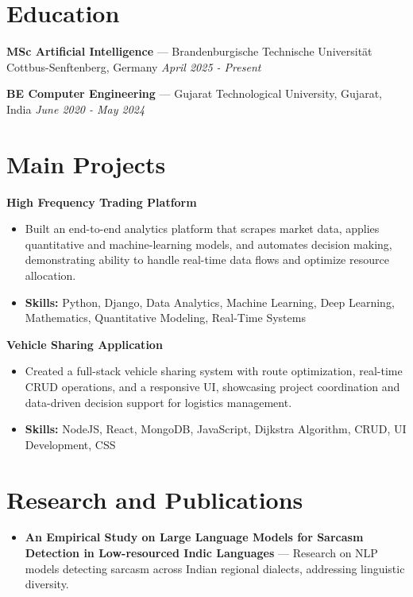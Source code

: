 \documentclass[a4paper,10pt]{article}
\begin{document}
\section*{Education}
\textbf{MSc Artificial Intelligence} — Brandenburgische Technische Universität Cottbus-Senftenberg, Germany \hfill \textit{April 2025 - Present}\par
\vspace{1.5pt}
\textbf{BE Computer Engineering} — Gujarat Technological University, Gujarat, India \hfill \textit{June 2020 - May 2024}\par

\section*{Main Projects}
\textbf{High Frequency Trading Platform}\par
\vspace{1pt}
\begin{itemize}
  \item Built an end-to-end analytics platform that scrapes market data, applies quantitative and machine-learning models, and automates decision making, demonstrating ability to handle real-time data flows and optimize resource allocation.
  \item \textbf{Skills:} Python, Django, Data Analytics, Machine Learning, Deep Learning, Mathematics, Quantitative Modeling, Real-Time Systems
\end{itemize}
\vspace{3pt}
\textbf{Vehicle Sharing Application}\par
\vspace{1pt}
\begin{itemize}
  \item Created a full-stack vehicle sharing system with route optimization, real-time CRUD operations, and a responsive UI, showcasing project coordination and data-driven decision support for logistics management.
  \item \textbf{Skills:} NodeJS, React, MongoDB, JavaScript, Dijkstra Algorithm, CRUD, UI Development, CSS
\end{itemize}

\section*{Research and Publications}
\begin{itemize}
\item \textbf{An Empirical Study on Large Language Models for Sarcasm Detection in Low-resourced Indic Languages} — Research on NLP models detecting sarcasm across Indian regional dialects, addressing linguistic diversity.
\end{itemize}
\end{document}
